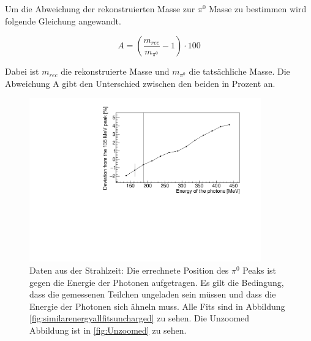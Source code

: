\documentclass[a4paper,11pt,oneside,final,german,openbib,pdftex]{scrbook}
\begin{document}
{ %
 
 
 Um die Abweichung der rekonstruierten Masse zur $\pi^0$ Masse zu bestimmen wird folgende Gleichung angewandt.
 
 \begin{equation}
 A = (\frac{m_{rec}}{m_{\pi^0}}-1) \cdot 100
 \end{equation}
 
 Dabei ist $m_{rec}$ die rekonstruierte Masse und $m_{\pi^0}$ die tats\"achliche Masse. Die Abweichung A gibt den Unterschied zwischen den beiden in Prozent an.
 
 
 \begin{figure}[h!]
 	\begin{center}
 		\includegraphics[width=100mm]{201728104StrahlzeitNoCutZoomed}
 	
 		\caption[Strahlzeit: Symmetrische Photonen; Abweichung]{Daten aus der Strahlzeit: Die errechnete Position des $\pi^0$ Peaks ist gegen die Energie der Photonen aufgetragen.
 			Es gilt die Bedingung, dass die gemessenen Teilchen ungeladen sein m\"ussen und dass die Energie der Photonen sich \"ahneln muss. Alle Fits sind in Abbildung \ref{fig:similarenergyallfitsuncharged} zu sehen. Die Unzoomed Abbildung ist in \ref{fig:Unzoomed} zu sehen.} 
 		\label{fig.Energydependency_pion}
 	\end{center}
 \end{figure}

}
\end{document}

